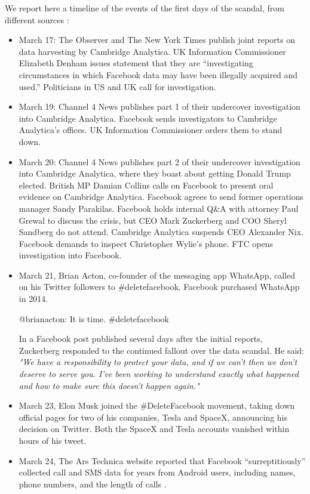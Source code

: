\documentclass[11pt, twoside]{report}
\begin{document}
We report here a timeline of the events of the first days of the scandal, from different sources \cite{nyt_timeline}:
\begin{itemize}

\item March 17: The Observer and The New York Times publish joint reports on data harvesting by Cambridge Analytica. UK Information Commissioner Elizabeth Denham issues statement that they are “investigating circumstances in which Facebook data may have been illegally acquired and used.” Politicians in US and UK call for investigation.

\item March 19: Channel 4 News publishes part 1 of their undercover investigation into Cambridge Analytica. Facebook sends investigators to Cambridge Analytica’s offices. UK Information Commissioner orders them to stand down. \cite{channel4}

\item March 20: Channel 4 News publishes part 2 of their undercover investigation into Cambridge Analytica, where they boast about getting Donald Trump elected. British MP Damian Collins calls on Facebook to present oral evidence on Cambridge Analytica. Facebook agrees to send former operations manager Sandy Parakilas. Facebook holds internal Q\&A with attorney Paul Grewal to discuss the crisis, but CEO Mark Zuckerberg and COO Sheryl Sandberg do not attend. Cambridge Analytica suspends CEO Alexander Nix. Facebook demands to inspect Christopher Wylie’s phone. FTC opens investigation into Facebook.
\item March 21,
  Brian Acton, co-founder of the messaging app WhatsApp, called on his Twitter followers to \#deletefacebook. Facebook purchased WhatsApp in 2014.
  \begin{center}
  @brianacton: It is time. \#deletefacebook\\
  \end{center}
In a Facebook post published several days after the initial reports, Zuckerberg responded to the continued fallout over the data scandal.
He said:\\
\textit{"We have a responsibility to protect your data, and if we can't then we don't deserve to serve you. I've been working to understand exactly what happened and how to make sure this doesn't happen again."}
\item March 23,
  Elon Musk joined the \#DeleteFacebook movement, taking down official pages for two of his companies, Tesla and SpaceX, announcing his decision on Twitter. Both the SpaceX and Tesla accounts vanished within hours of his tweet.
\item March 24,
  The Ars Technica website reported that Facebook ``surreptitiously'' collected call and SMS data for years from Android users, including names, phone numbers, and the length of calls \cite{ars_technica}.
\end{itemize}
\end{document}

